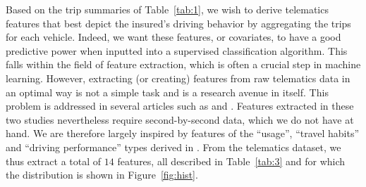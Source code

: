 \documentclass{article}
\begin{document}
Based on the trip summaries of Table~\ref{tab:1}, we wish to derive telematics features that best depict the insured's driving behavior by aggregating the trips for each vehicle. Indeed, we want these features, or covariates, to have a good predictive power when inputted into a supervised classification algorithm. This falls within the field of feature extraction, which is often a crucial step in machine learning. However, extracting (or creating) features from raw telematics data in an optimal way is not a simple task and is a research avenue in itself. This problem is addressed in several articles such as \cite{wuthrich2017covariate} and \cite{gao2018feature}. Features extracted in these two studies nevertheless require second-by-second data, which we do not have at hand. We are therefore largely inspired by features of the ``usage'', ``travel habits'' and ``driving performance'' types derived in \cite{huang2019automobile}. From the telematics dataset, we thus extract a total of $14$ features, all described in Table~\ref{tab:3} and for which the distribution is shown in Figure~\ref{fig:hist}. 
\end{document}
